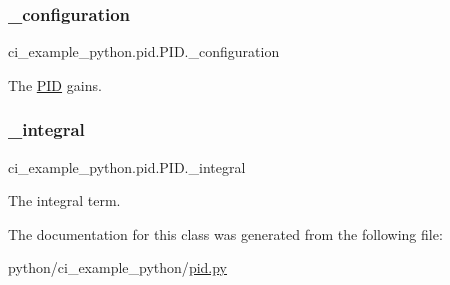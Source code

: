 \subsubsection{\texorpdfstring{\+\_\+configuration}{\_configuration}}
{\footnotesize\ttfamily ci\+\_\+example\+\_\+python.\+pid.\+P\+I\+D.\+\_\+configuration\hspace{0.3cm}{\ttfamily [private]}}



The \hyperlink{classci__example__python_1_1pid_1_1PID}{P\+ID} gains. 

\mbox{\label{classci__example__python_1_1pid_1_1PID_a26b060dae844d341f5445980e869ba15}} 
\subsubsection{\texorpdfstring{\+\_\+integral}{\_integral}}
{\footnotesize\ttfamily ci\+\_\+example\+\_\+python.\+pid.\+P\+I\+D.\+\_\+integral\hspace{0.3cm}{\ttfamily [private]}}



The integral term. 



The documentation for this class was generated from the following file\+:\begin{DoxyCompactItemize}
\item 
python/ci\+\_\+example\+\_\+python/\hyperlink{pid_8py}{pid.\+py}\end{DoxyCompactItemize}
